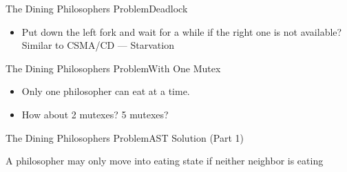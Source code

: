 \begin{frame}{The Dining Philosophers Problem}{Deadlock}
  \begin{center}
  \end{center}
  \begin{itemize}
  \item Put down the left fork and wait for a while if the right one is not available?
    Similar to CSMA/CD --- Starvation
  \end{itemize}
\end{frame}

\begin{frame}{The Dining Philosophers Problem}{With One Mutex}
  \begin{minipage}{.49\linewidth}
    \begin{center}
    \end{center}
  \end{minipage} \hfill
  \begin{minipage}{.49\linewidth}
    \begin{center}
    \end{center}
  \end{minipage}
  \pause
  \begin{itemize}
  \item Only one philosopher can eat at a time.
  \item How about 2 mutexes? 5 mutexes?
  \end{itemize}
\end{frame}

\begin{frame}{The Dining Philosophers Problem}{AST Solution (Part 1)}
\begin{iblock}{A philosopher may only move into eating state if neither neighbor is
    eating}
  \begin{center}
  \end{center}
\end{iblock}
\end{frame}

